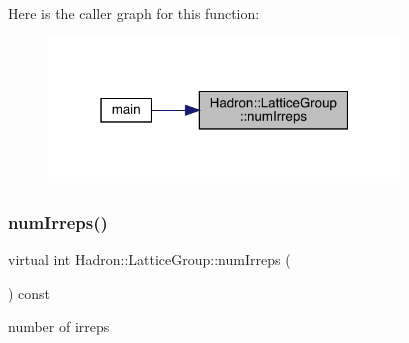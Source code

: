 Here is the caller graph for this function\+:
\nopagebreak
\begin{figure}[H]
\begin{center}
\leavevmode
\includegraphics[width=265pt]{dd/d2e/structHadron_1_1LatticeGroup_a3edaca488144b5d2a9cf73fe653add34_icgraph}
\end{center}
\end{figure}
\mbox{\label{structHadron_1_1LatticeGroup_a3edaca488144b5d2a9cf73fe653add34}} 
\subsubsection{\texorpdfstring{numIrreps()}{numIrreps()}\hspace{0.1cm}{\footnotesize\ttfamily [3/3]}}
{\footnotesize\ttfamily virtual int Hadron\+::\+Lattice\+Group\+::num\+Irreps (\begin{DoxyParamCaption}{ }\end{DoxyParamCaption}) const\hspace{0.3cm}{\ttfamily [pure virtual]}}

number of irreps 

